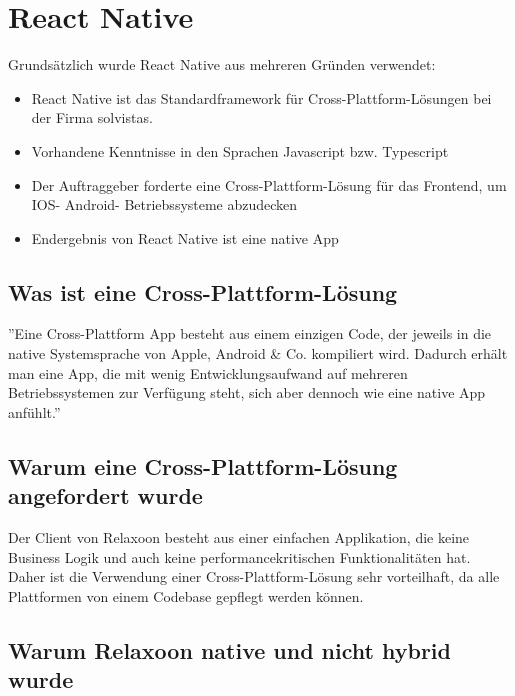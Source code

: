 
\section{React Native}

Grundsätzlich wurde React Native aus mehreren Gründen verwendet:
\begin{itemize}
    \item React Native ist das Standardframework für Cross-Plattform-Lösungen bei der Firma solvistas.
    \item Vorhandene Kenntnisse in den Sprachen Javascript bzw. Typescript
    \item Der Auftraggeber forderte eine Cross-Plattform-Lösung für das Frontend, um IOS- Android- Betriebssysteme abzudecken
    \item Endergebnis von React Native ist eine native App
\end{itemize}




\subsection{Was ist eine Cross-Plattform-Lösung}

''Eine Cross-Plattform App besteht aus einem einzigen Code,
der jeweils in die native Systemsprache von Apple, Android \& Co. kompiliert wird.
Dadurch erhält man eine App, die mit wenig Entwicklungsaufwand auf mehreren
Betriebssystemen zur Verfügung steht, sich aber dennoch wie eine native App
anfühlt.''
\cite{cross-plattform}




\subsection{Warum  eine Cross-Plattform-Lösung angefordert wurde}
Der Client von Relaxoon besteht aus einer einfachen Applikation, die keine Business Logik
und auch keine performancekritischen Funktionalitäten hat.
Daher ist die Verwendung einer Cross-Plattform-Lösung sehr vorteilhaft,
da alle Plattformen von einem Codebase gepflegt werden können.



\subsection{Warum Relaxoon native und nicht hybrid wurde}

